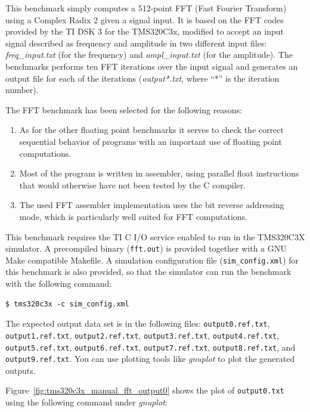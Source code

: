 This benchmark simply computes a 512-point FFT (Fast Fourier Transform) using a Complex Radix 2 given a signal input.
It is based on the FFT codes provided by the TI DSK 3 for the TMS320C3x, modified to accept an input signal described as frequency and amplitude in two different input files: \textit{freq\_input.txt} (for the frequency) and \textit{ampl\_input.txt} (for the amplitude).
The benchmarks performs ten FFT iterations over the input signal and generates an output file for each of the iterations (\textit{output*.txt}, where ``*'' is the iteration number).

The FFT benchmark has been selected for the following reasons:
\begin{enumerate}
	\item As for the other floating point benchmarks it serves to check the correct sequential behavior of programs with an important use of floating point computations.
	\item Most of the program is written in assembler, using parallel float instructions that would otherwise have not been tested by the C compiler.
	\item The used FFT assembler implementation uses the bit reverse addressing mode, which is particularly well suited for FFT computations.
\end{enumerate} 

This benchmark requires the TI C I/O service enabled to run in the TMS320C3X simulator.
A precompiled binary (\texttt{fft.out}) is provided together with a GNU Make compatible Makefile.
A simulation configuration file (\texttt{sim\_config.xml}) for this benchmark is also provided, so that the simulator can run the benchmark with the following command:

\begin{verbatim}
$ tms320c3x -c sim_config.xml
\end{verbatim}

The expected output data set is in the following files: \texttt{output0.ref.txt}, \texttt{output1.ref.txt}, \texttt{output2.ref.txt}, \texttt{output3.ref.txt}, \texttt{output4.ref.txt}, \texttt{output5.ref.txt}, \texttt{output6.ref.txt}, \texttt{output7.ref.txt}, \texttt{output8.ref.txt}, and \texttt{output9.ref.txt}.
You can use plotting tools like \textit{gnuplot} to plot the generated outputs. 

Figure~\ref{fig:tms320c3x_manual_fft_output0} shows the plot of \texttt{output0.txt} using the following command under \textit{gnuplot}:

